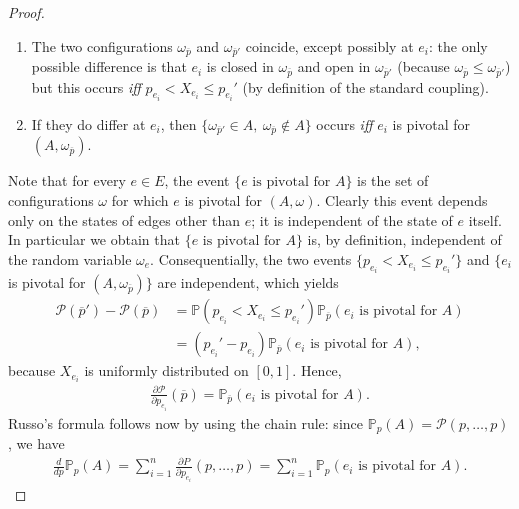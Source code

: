 \documentclass[12pt,a4paper]{article}
\theoremstyle{definition}
\begin{document}
\begin{proof}
\begin{enumerate}
\item The two configurations $\omega_{\overline{p}}$ and $\omega_{\overline{p}'}$ coincide, except possibly at $e_i$: the only possible difference is that $e_i$ is closed in  $\omega_{\overline{p}}$ and open in $\omega_{\overline{p}'}$ (because $\omega_{\overline{p}} \leq \omega_{\overline{p}'}$) but this occurs \textit{iff} $p_{e_i} < X_{e_i} \leq p_{e_i}'$ (by definition of the standard coupling). 
\item If they do differ at $e_i$, then $\{\omega_{\overline{p}'} \in A, \ \omega_{\overline{p}} \notin A\}$ occurs \textit{iff} $e_i$ is pivotal for $(A, \omega_{\overline{p}})$. 
\end{enumerate}
Note that for every $e \in E$, the event $\{e \text{ is pivotal for } A\}$ is the set of configurations $\omega$ for which $e$ is pivotal
for $(A, \omega)$. Clearly this event depends only on the states of edges
other than $e$; it is independent of the state of $e$ itself. In particular we obtain that $\{e \text{ is pivotal for }A\}$ is, by definition, independent of the random variable $\omega_e$. Consequentially, the two events $\{p_{e_i} < X_{e_i} \leq p_{e_i}'\}$ and $\{e_i$ is pivotal for $(A, \omega_{\overline{p}})\}$ are independent, which yields 
\begin{align*}
\mathcal{P}(\overline{p}') - \mathcal{P}(\overline{p}) &= \mathbb{P}(p_{e_i} < X_{e_i} \leq p_{e_i}' ) \mathbb{P}_{\overline{p}} (e_i \text{ is pivotal for }A) \\
&= (p_{e_i}'-p_{e_i}) \mathbb{P}_{\overline{p}} (e_i \text{ is pivotal for }A),
\end{align*}
because $X_{e_i}$ is uniformly distributed on $[0,1]$. Hence, 
\begin{align*}
\frac{\partial \mathcal{P}}{\partial p_{e_i}}( \overline{p}) = \mathbb{P}_{\overline{p}} ( e_i \text{ is pivotal for }A). 
\end{align*}
Russo's formula follows now by using the chain rule: since $\mathbb{P}_p(A)= \mathcal{P}(p, \dots , p)$, we have 
\begin{align*}
\frac{d}{dp} \mathbb{P}_p(A) = \sum_{i=1}^n \frac{\partial P}{\partial p_{e_i}}(p, \dots , p) = \sum_{i=1}^n \mathbb{P}_p(e_i \text{ is pivotal for }A). 
\end{align*}
\end{proof}
\end{document}
